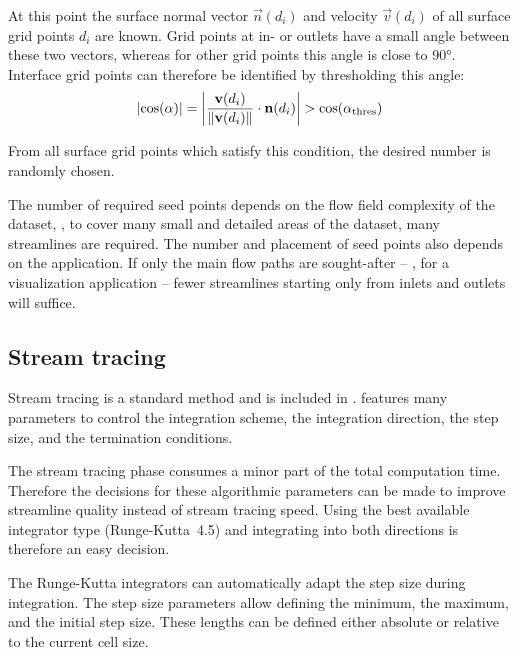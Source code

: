 At this point the surface normal vector $\vec{n}(d_i)$ and velocity $\vec{v}(d_i)$ of all surface grid points $d_i$ are known. Grid points at in- or outlets have a small angle between these two vectors, whereas for other grid points this angle is close to \ang{90}. Interface grid points can therefore be identified by thresholding this angle:
%
\begin{equation}
  \left| \cos(\alpha) \right| = 
  	\left|
			\scalprod{
			  \frac{
				  \vec{v}(d_i)
				}{
				  \|\vec{v}(d_i)\|
				}
			}{
				\vec{n}(d_i)
			}
		\right| > \cos(\alpha_\text{thres}) 
\end{equation}

From all surface grid points which satisfy this condition, the desired number is randomly chosen.

The number of required seed points depends on %
the flow field complexity of the dataset, \ie, to cover many small and detailed areas of the dataset, many streamlines are required. The number and placement of seed points also depends on the application. If only the main flow paths are sought-after -- \eg, for a visualization application -- fewer streamlines starting only from inlets and outlets will suffice.

\subsection{Stream tracing}
Stream tracing is a standard method and is included in \vtk.  features many parameters to control the integration scheme, the integration direction, the step size, and the termination conditions.

The stream tracing phase consumes a minor part of the total computation time. Therefore the decisions for these algorithmic parameters can be made to improve streamline quality instead of stream tracing speed. Using the best available integrator type (Runge-Kutta~4.5) and integrating into both directions is therefore an easy decision.

The Runge-Kutta integrators can automatically adapt the step size during integration. The step size parameters allow defining the minimum, the maximum, and the initial step size. These lengths can be defined either absolute or relative to the current cell size.

